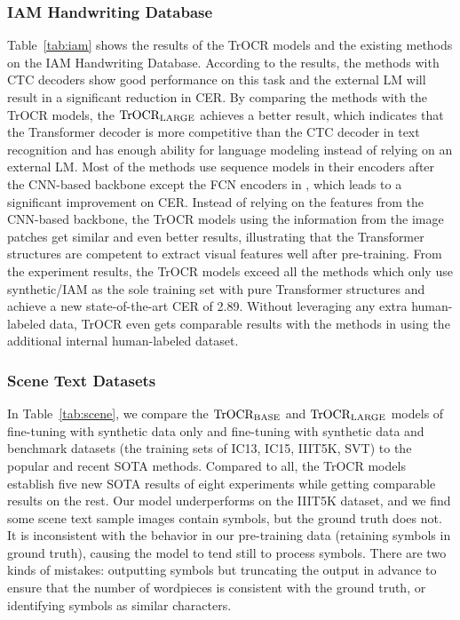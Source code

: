 \documentclass[letterpaper]{article} \usepackage{aaai23}  \usepackage{times}  \usepackage{helvet}  \usepackage{courier}  \usepackage[hyphens]{url}  \usepackage{graphicx} \urlstyle{rm} \def\UrlFont{\rm}  \usepackage{natbib}  \usepackage{caption} \frenchspacing  \setlength{\pdfpagewidth}{8.5in} \setlength{\pdfpageheight}{11in} \usepackage{algorithm}
\begin{document}
\subsubsection{IAM Handwriting Database}
Table~\ref{tab:iam} shows the results of the TrOCR models and the existing methods on the IAM Handwriting Database. According to the results, the methods with CTC decoders show good performance on this task and the external LM will result in a significant reduction in CER. By comparing the methods \cite{bluche2017gated} with the TrOCR models, the $\textrm{TrOCR}_{\rm LARGE}$ achieves a better result, which indicates that the Transformer decoder is more competitive than the CTC decoder in text recognition and has enough ability for language modeling instead of relying on an external LM.
Most of the methods use sequence models in their encoders after the CNN-based backbone except the FCN encoders in \cite{wang2020decoupled}, which leads to a significant improvement on CER. Instead of relying on the features from the CNN-based backbone, the TrOCR models using the information from the image patches get similar and even better results, illustrating that the Transformer structures are competent to extract visual features well after pre-training. From the experiment results, the TrOCR models exceed all the methods which only use synthetic/IAM as the sole training set with pure Transformer structures and achieve a new state-of-the-art CER of 2.89. Without leveraging any extra human-labeled data, TrOCR even gets comparable results with the methods in \cite{diaz2021rethinking} using the additional internal human-labeled dataset. 

\subsubsection{Scene Text Datasets}
In Table~\ref{tab:scene}, we compare the $\textrm{TrOCR}_{\rm BASE}$ and $\textrm{TrOCR}_{\rm LARGE}$ models of fine-tuning with synthetic data only and fine-tuning with synthetic data and benchmark datasets (the training sets of IC13, IC15, IIIT5K, SVT) to the popular and recent SOTA methods. 
Compared to all, the TrOCR models establish five new SOTA results of eight experiments while getting comparable results on the rest. Our model underperforms on the IIIT5K dataset, and we find some scene text sample images contain symbols, but the ground truth does not. It is inconsistent with the behavior in our pre-training data (retaining symbols in ground truth), causing the model to tend still to process symbols. There are two kinds of mistakes: outputting symbols but truncating the output in advance to ensure that the number of wordpieces is consistent with the ground truth, or identifying symbols as similar characters.
\end{document}
